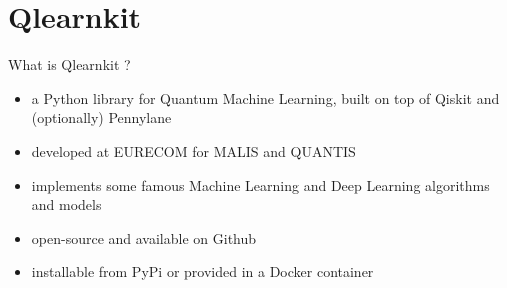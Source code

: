 \graphicspath{{assets/qlearnkit/}}

\section{Qlearnkit}


\begin{frame}{What is Qlearnkit ?}
    \begin{itemize}
        \item a Python library for \alert{Quantum Machine Learning}, built on top of \alert{Qiskit} and (optionally) \alert{Pennylane}
        \item developed at EURECOM for \alert{MALIS} and \alert{QUANTIS}
        \item implements some famous Machine Learning and Deep Learning algorithms and models
        \item open-source and available on Github
        \item installable from PyPi or provided in a Docker container 
        \vspace{0.5cm}
        

\end{itemize}
\end{frame}
